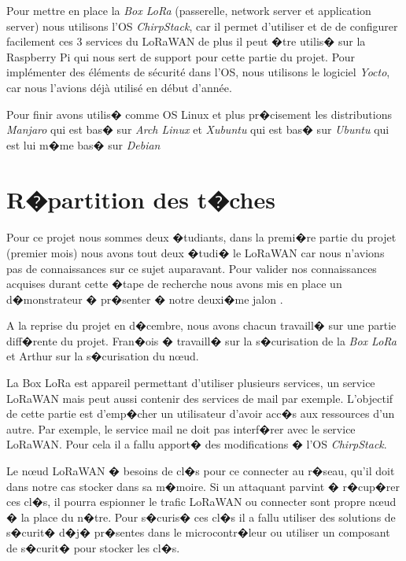 \documentclass[a4paper, titlepage,12pt]{report}
\begin{document}
Pour mettre en place la \textit{Box LoRa} (passerelle, network server et application server) nous utilisons l'OS \textit{ChirpStack}, car il permet d'utiliser et de de configurer facilement ces 3 services du LoRaWAN de plus il peut �tre utilis� sur la Raspberry Pi qui nous sert de support pour cette partie du projet. Pour implémenter des éléments de sécurité dans l'OS, nous utilisons le logiciel \textit{Yocto}, car nous l'avions déjà utilisé en début d'année.

Pour finir avons utilis� comme OS Linux et plus pr�cisement les distributions \textit{Manjaro} qui est bas� sur \textit{Arch Linux} et \textit{Xubuntu} qui est bas� sur \textit{Ubuntu} qui est lui m�me bas� sur \textit{Debian}

\section{R�partition des t�ches}
\paragraph{}
Pour ce projet nous sommes deux �tudiants, dans la premi�re partie du projet (premier mois) nous avons tout deux �tudi� le LoRaWAN car nous n'avions pas de connaissances sur ce sujet auparavant. Pour valider nos connaissances acquises durant cette �tape de recherche nous avons mis en place un d�monstrateur � pr�senter � notre deuxi�me jalon .

A la reprise du projet en d�cembre, nous avons chacun travaill� sur une partie diff�rente du projet. Fran�ois  � travaill� sur la s�curisation de la \textit{Box LoRa} et Arthur sur la s�curisation du n\oe{}ud.

La Box LoRa est appareil permettant d'utiliser plusieurs services, un service LoRaWAN mais peut aussi contenir des services de mail par exemple. L'objectif de cette partie est d'emp�cher un utilisateur d'avoir acc�s aux ressources d'un autre. Par exemple, le service mail ne doit pas interf�rer avec le service LoRaWAN. Pour cela il a fallu apport� des modifications � l'OS \textit{ChirpStack}.

Le n\oe{}ud LoRaWAN � besoins de cl�s pour ce connecter au r�seau, qu'il doit dans notre cas stocker dans sa m�moire. Si un attaquant parvint � r�cup�rer ces cl�s, il pourra  espionner le trafic LoRaWAN ou connecter sont propre n\oe{}ud � la place du n�tre. Pour s�curis� ces cl�s il a fallu utiliser des solutions de s�curit� d�j� pr�sentes dans le microcontr�leur ou utiliser un composant de s�curit� pour stocker les cl�s.
\end{document}
